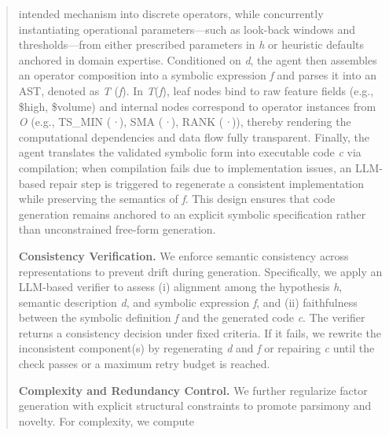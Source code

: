\documentclass[
]{article}
\begin{document}
\begin{quote}
intended mechanism into discrete operators, while concurrently
instantiating operational parameters---such as look-back windows and
thresholds---from either prescribed parameters in \emph{h} or heuristic
defaults anchored in domain expertise. Conditioned on \emph{d}, the
agent then assembles an operator composition into a symbolic expression
\emph{f} and parses it into an AST, denoted as \emph{T} (\emph{f}). In
\emph{T}(\emph{f}), leaf nodes bind to raw feature fields (e.g., \$high,
\$volume) and internal nodes correspond to operator instances from
\emph{O} (e.g., TS\_MIN (\emph{·}), SMA (\emph{·}), RANK (\emph{·})),
thereby rendering the computational dependencies and data flow fully
transparent. Finally, the agent translates the validated symbolic form
into executable code \emph{c} via compilation; when compilation fails
due to implementation issues, an LLM-based repair step is triggered to
regenerate a consistent implementation while preserving the semantics of
\emph{f}. This design ensures that code generation remains anchored to
an explicit symbolic specification rather than unconstrained free-form
generation.

\textbf{Consistency Verification.} We enforce semantic consistency
across representations to prevent drift during generation. Specifically,
we apply an LLM-based verifier to assess (i) alignment among the
hypothesis \emph{h}, semantic description \emph{d}, and symbolic
expression \emph{f}, and (ii) faithfulness between the symbolic
definition \emph{f} and the generated code \emph{c}. The verifier
returns a consistency decision under fixed criteria. If it fails, we
rewrite the inconsistent component(s) by regenerating \emph{d} and
\emph{f} or repairing \emph{c} until the check passes or a maximum retry
budget is reached.

\textbf{Complexity and Redundancy Control.} We further regularize factor
generation with explicit structural constraints to promote parsimony and
novelty. For complexity, we compute
\end{quote}
\end{document}
